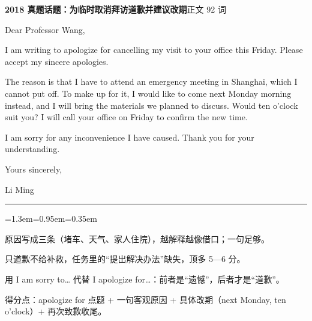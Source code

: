 \documentclass[10pt,a4paper]{ctexart}
\begin{document}
\vspace{1pt}
\vspace{2pt}\noindent\colorbox{soft}{\parbox{\dimexpr\linewidth-2\fboxsep\relax}{%
\vspace{2pt}
{\footnotesize\bfseries\color{accent}2018 真题话题：为临时取消拜访道歉并建议改期}\hfill{\footnotesize\color{gray}正文 92 词}
\par\vspace{2pt}
\footnotesize Dear Professor Wang,\par
\footnotesize I am writing to apologize for cancelling my visit to your office this Friday. Please accept my sincere apologies.\par
\footnotesize The reason is that I have to attend an emergency meeting in Shanghai, which I cannot put off. To make up for it, I would like to come next Monday morning instead, and I will bring the materials we planned to discuss. Would ten o'clock suit you? I will call your office on Friday to confirm the new time.\par
\footnotesize I am sorry for any inconvenience I have caused. Thank you for your understanding.\par
\footnotesize Yours sincerely,\par
\footnotesize Li Ming\par
\par{}
\par\vspace{1pt}}}\par
\vspace{2pt}
\vspace{4pt}\par\nopagebreak
{\color{rule}\rule{\linewidth}{0.6pt}}\par\nopagebreak
\vspace{1pt}
\vspace{1pt}\begingroup\setlength{\parindent}{0pt}
\begin{list}{}{\leftmargin=1.3em=0.95em=0.35em\itemindent=0pt\topsep=0pt\partopsep=0pt\parsep=1.5pt\itemsep=0pt}
\item[{\color{warn}\scriptsize$\blacksquare$}]{\footnotesize 原因写成三条（堵车、天气、家人住院），越解释越像借口；一句足够。}
\item[{\color{warn}\scriptsize$\blacksquare$}]{\footnotesize 只道歉不给补救，任务里的“提出解决办法”缺失，顶多 5—6 分。}
\item[{\color{warn}\scriptsize$\blacksquare$}]{\footnotesize 用 I am sorry to… 代替 I apologize for…：前者是“遗憾”，后者才是“道歉”。}
\item[{\color{warn}\scriptsize$\blacksquare$}]{\footnotesize 得分点：apologize for 点题 + 一句客观原因 + 具体改期（next Monday, ten o'clock）+ 再次致歉收尾。}
\end{list}
\end{document}

